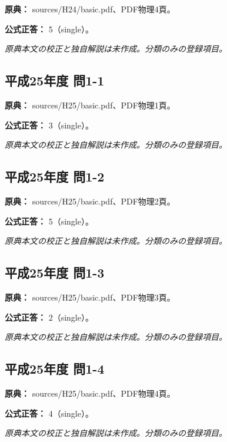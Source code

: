 \noindent\textbf{原典：} sources/H24/basic.pdf、PDF物理4頁。

\textbf{公式正答：} 5（single）。

\par\textit{原典本文の校正と独自解説は未作成。分類のみの登録項目。}

\subsection{平成25年度 問1-1}
\label{q:h25-reg-basic-1-1}

\noindent\textbf{原典：} sources/H25/basic.pdf、PDF物理1頁。

\textbf{公式正答：} 3（single）。

\par\textit{原典本文の校正と独自解説は未作成。分類のみの登録項目。}

\subsection{平成25年度 問1-2}
\label{q:h25-reg-basic-1-2}

\noindent\textbf{原典：} sources/H25/basic.pdf、PDF物理2頁。

\textbf{公式正答：} 5（single）。

\par\textit{原典本文の校正と独自解説は未作成。分類のみの登録項目。}

\subsection{平成25年度 問1-3}
\label{q:h25-reg-basic-1-3}

\noindent\textbf{原典：} sources/H25/basic.pdf、PDF物理3頁。

\textbf{公式正答：} 2（single）。

\par\textit{原典本文の校正と独自解説は未作成。分類のみの登録項目。}

\subsection{平成25年度 問1-4}
\label{q:h25-reg-basic-1-4}

\noindent\textbf{原典：} sources/H25/basic.pdf、PDF物理4頁。

\textbf{公式正答：} 4（single）。

\par\textit{原典本文の校正と独自解説は未作成。分類のみの登録項目。}

